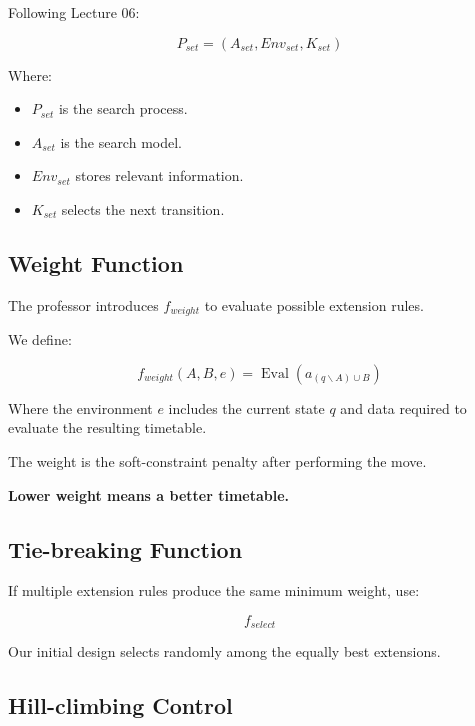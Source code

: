 \documentclass[11pt,letterpaper]{article}
\newcommand{\setminusop}{\mathbin{\backslash}}
\newcommand{\Eval}{\operatorname{Eval}}
\newcommand{\Env}{\mathit{Env}}
\begin{document}
Following Lecture 06:

\begin{equation}
\boxed{
P_{set}=
(A_{set},\Env_{set},K_{set})
}
\end{equation}

Where:

\begin{itemize}
    \item $P_{set}$ is the search process.
    \item $A_{set}$ is the search model.
    \item $\Env_{set}$ stores relevant information.
    \item $K_{set}$ selects the next transition.
\end{itemize}

\subsection{Weight Function}

The professor introduces $f_{weight}$
to evaluate possible extension rules.

We define:

\begin{equation}
\boxed{
f_{weight}(A,B,e)=
\Eval\left(a_{(q\setminusop A)\cup B}\right)
}
\end{equation}

Where the environment $e$ includes
the current state $q$ and data required
to evaluate the resulting timetable.

The weight is the soft-constraint
penalty after performing the move.

\textbf{Lower weight means a better timetable.}

\subsection{Tie-breaking Function}

If multiple extension rules produce
the same minimum weight, use:

\begin{equation}
\boxed{
f_{select}
}
\end{equation}

Our initial design selects randomly
among the equally best extensions.

\subsection{Hill-climbing Control}
\end{document}
